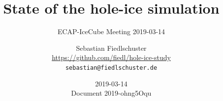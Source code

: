 \documentclass[green, 12pt]{beamer}
\title[State of the hole-ice simulation, ECAP-IceCube Meeting 2019-03-14]{State of the hole-ice simulation}
\subtitle{ECAP-IceCube Meeting 2019-03-14}
\date{2019-03-14 \\ \vspace*{2mm} \tiny{Document 2019-ohng5Oqu} \normalsize}
\author[Sebastian Fiedlschuster, ECAP Erlangen]{Sebastian Fiedlschuster \\ \tiny{\url{https://github.com/fiedl/hole-ice-study}} \\ \tiny\texttt{sebastian@fiedlschuster.de}}
\institute{Erlangen Centre for Astroparticle Physics}
\newif\ifplacelogo %
\begin{document}



\placelogofalse

%



% 
%
%
%     
%
%     
%     
%     
%     
%     
%
%     
%
%     
%
%   
%

\end{document}
